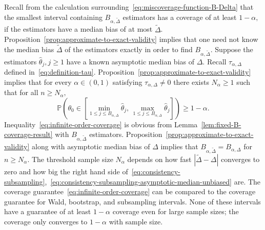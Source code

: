 \documentclass{article}
\numberwithin{myalgctr}{section}
\begin{document}
Recall from the calculation surrounding~\eqref{eq:miscoverage-function-B-Delta} that the smallest interval containing $B_{\alpha,\widetilde{\Delta}}$ estimators has a coverage of at least $1 - \alpha,$ if the estimators have a median bias of at most $\widetilde{\Delta}$. Proposition~\ref{prop:approximate-to-exact-validity} implies that one need not know the median bias $\widetilde{\Delta}$ of the estimators exactly in order to find $B_{\alpha,\widetilde{\Delta}}$. Suppose the estimators $\widehat{\theta}_j, j\ge1$ have a known asymptotic median bias of $\Delta$. %
Recall $\tau_{\alpha,\Delta}$ defined in~\eqref{eq:definition-tau}. Proposition~\ref{prop:approximate-to-exact-validity} implies that for every $\alpha\in(0, 1)$ satisfying $\tau_{\alpha,\Delta} \neq 0$ there exists $N_{\alpha}\ge1$ such that for all $n\ge N_{\alpha},$
\begin{equation}\label{eq:infinite-order-coverage}
\mathbb{P}\left(\theta_0 \in \left[\min_{1\le j\le B_{\alpha,\Delta}}\widehat{\theta}_j,\,\max_{1\le j\le B_{\alpha,\Delta}}\widehat{\theta}_j\right]\right) \ge 1 - \alpha.
\end{equation}
Inequality~\eqref{eq:infinite-order-coverage} is obvious from Lemma~\ref{lem:fixed-B-coverage-result} with $B_{\alpha,\widetilde{\Delta}}$ estimators. Proposition~\ref{prop:approximate-to-exact-validity} along with asymptotic median bias of $\Delta$ implies that $B_{\alpha,\widetilde{\Delta}} = B_{\alpha,\Delta}$ for $n\ge N_{\alpha}$. The threshold sample size $N_{\alpha}$ depends on how fast $|\widetilde{\Delta} - \Delta|$ converges to zero and how big the right hand side of~\eqref{eq:consistency-subsampling},~\eqref{eq:consistency-subsampling-asymptotic-median-unbiased} are. The coverage guarantee~\eqref{eq:infinite-order-coverage} can be compared to the coverage guarantee for Wald, bootstrap, and subsampling intervals. None of these intervals have a guarantee of at least $1 - \alpha$ coverage even for large sample sizes; the coverage only converges to $1 - \alpha$ with sample size. 
\end{document}
